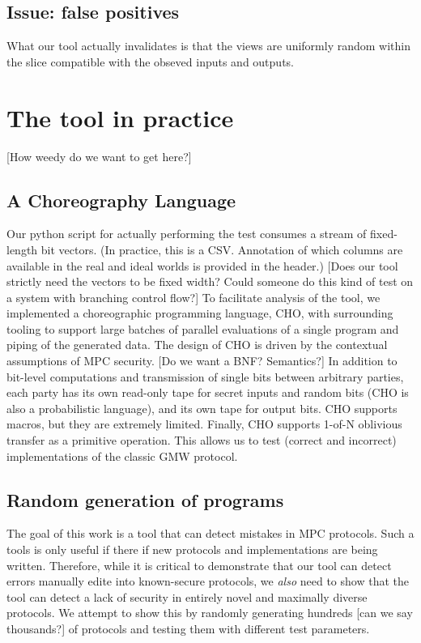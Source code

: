 \documentclass[conference]{IEEEtran}
\begin{document}
\subsection{Issue: false positives}

What our tool actually invalidates is that the views are uniformly random within the slice compatible with the obseved inputs and outputs. 


\section{The tool in practice}

[How weedy do we want to get here?]


\subsection{A Choreography Language}

Our python script for actually performing the test consumes a stream of fixed-length bit vectors.
(In practice, this is a CSV. Annotation of which columns are available in the real and ideal worlds is provided in the header.)
[Does our tool strictly need the vectors to be fixed width? Could someone do this kind of test on a system with branching control flow?]
To facilitate analysis of the tool, we implemented a choreographic programming language, CHO,
with surrounding tooling to support large batches of parallel evaluations of a single program and piping of the generated data.
The design of CHO is driven by the contextual assumptions of MPC security.
[Do we want a BNF? Semantics?]
In addition to bit-level computations and transmission of single bits between arbitrary parties,
each party has its own read-only tape for secret inputs and random bits
(CHO is also a probabilistic language),
and its own tape for output bits.
CHO supports macros, but they are extremely limited.
Finally, CHO supports 1-of-N oblivious transfer as a primitive operation.
This allows us to test (correct and incorrect) implementations of the classic GMW protocol.

\subsection{Random generation of programs}

The goal of this work is a tool that can detect mistakes in MPC protocols.
Such a tools is only useful if there if new protocols and implementations are being written.
Therefore, while it is critical to demonstrate that our tool can detect errors manually edite into known-secure protocols,
we \textit{also} need to show that the tool can detect a lack of security in entirely novel and maximally diverse protocols.
We attempt to show this by randomly generating hundreds [can we say thousands?] of protocols and testing them with different test parameters.
\end{document}
